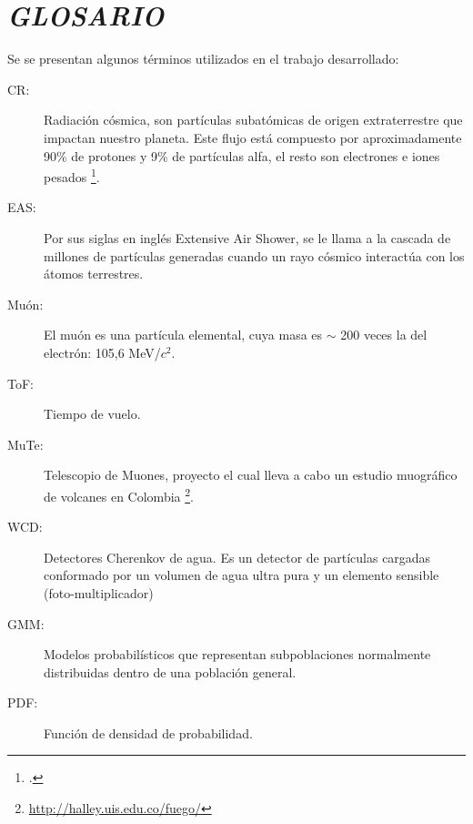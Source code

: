 \chapter*{\textit{GLOSARIO}}
Se se presentan algunos términos utilizados en el trabajo desarrollado:
\begin{description}
\item[CR:] Radiación cósmica, son partículas subatómicas de origen extraterrestre que impactan nuestro planeta. Este flujo está compuesto por aproximadamente 90\% de protones y 9\% de partículas alfa, el resto son electrones e iones pesados \footcite{procureur2018muon}.

\item[EAS:] Por sus siglas en inglés Extensive Air Shower, se le llama a la cascada de millones de partículas generadas cuando un rayo cósmico interactúa con los átomos terrestres.

\item[Muón:] El muón es una partícula elemental, cuya masa es $\sim$ 200 veces la del electrón: 105,6 MeV/$c^2$. 
\item[ToF: ] Tiempo de vuelo.
\item[MuTe:] Telescopio de Muones, proyecto el cual lleva a cabo un estudio muográfico de volcanes en Colombia \footnote{ \url{http://halley.uis.edu.co/fuego/}}.

\item[WCD:] Detectores Cherenkov de agua. Es un detector de partículas cargadas conformado por un volumen de agua ultra pura y un elemento sensible (foto-multiplicador)
\item[GMM: ] Modelos probabilísticos que representan subpoblaciones normalmente distribuidas dentro de una población general.
\item[PDF: ] Función de densidad de probabilidad.

\end{description}
